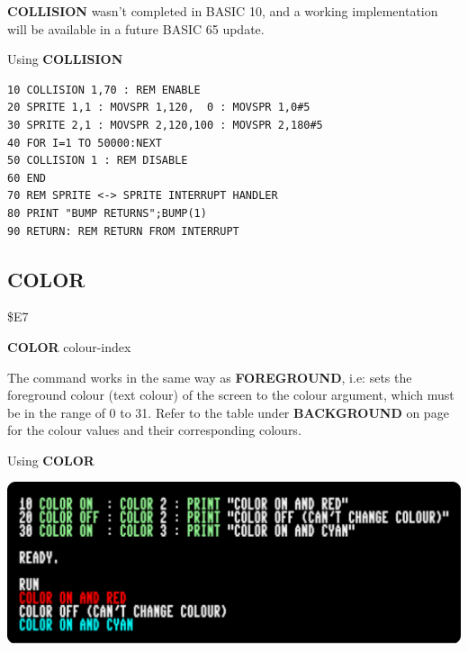 \begin{description}[leftmargin=2cm,style=nextline]
\item [Info:] {\bf COLLISION} wasn't completed in BASIC 10, and
               a working implementation will be available in a future BASIC 65 update.


\item [Example:] Using {\bf COLLISION}
\begin{tcolorbox}[colback=black,coltext=white]
\verbatimfont{\codefont}
\begin{verbatim}
10 COLLISION 1,70 : REM ENABLE
20 SPRITE 1,1 : MOVSPR 1,120,  0 : MOVSPR 1,0#5
30 SPRITE 2,1 : MOVSPR 2,120,100 : MOVSPR 2,180#5
40 FOR I=1 TO 50000:NEXT
50 COLLISION 1 : REM DISABLE
60 END
70 REM SPRITE <-> SPRITE INTERRUPT HANDLER
80 PRINT "BUMP RETURNS";BUMP(1)
90 RETURN: REM RETURN FROM INTERRUPT
\end{verbatim}
\end{tcolorbox}
\end{description}


\newpage
\subsection{COLOR}
\begin{description}[leftmargin=2cm,style=nextline]
\item [Token:] \$E7
\item [Format:] {\bf COLOR} colour-index
\item [Usage:] The command works in the same way as {\bf FOREGROUND},
               i.e: sets the foreground colour
               (text colour) of the screen to the colour argument, which
                must be in the range of 0 to 31. Refer to the table
               under {\bf BACKGROUND} on page \pageref{colourtable} for
               the colour values and their corresponding colours.

\item [Example:] Using {\bf COLOR}
\item \begin{center}\includegraphics[width=0.8\linewidth]{images/colour-example.png}\end{center}
\end{description}

